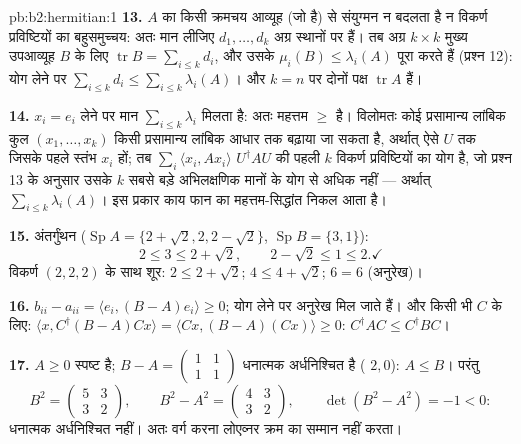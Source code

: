 \begin{solution}{pb:b2:hermitian:1}
\textbf{13.} $A$ का किसी क्रमचय आव्यूह (जो  है) से संयुग्मन न
 बदलता है न विकर्ण प्रविष्टियों का बहुसमुच्चय: अतः मान लीजिए $d_1, \dots, d_k$
अग्र स्थानों पर हैं। तब अग्र $k\times k$ मुख्य उपआव्यूह $B$ के लिए $\operatorname{tr} B = \sum_{i\leq k}d_i$, और उसके
 $\mu_i(B) \leq \lambda_i(A)$ पूरा करते हैं (प्रश्न 12): योग लेने पर $\sum_{i\leq k}d_i \leq \sum_{i\leq k}\lambda_i(A)$। और $k =
n$ पर
दोनों पक्ष $\operatorname{tr} A$ हैं।

\textbf{14.} $x_i = e_i$ लेने पर मान $\sum_{i\leq k}\lambda_i$ मिलता है: अतः महत्तम $\geq$ है। विलोमतः कोई
प्रसामान्य लांबिक कुल $(x_1, \dots, x_k)$ किसी प्रसामान्य लांबिक आधार तक बढ़ाया जा सकता
है, अर्थात् ऐसे  $U$ तक जिसके पहले स्तंभ $x_i$ हों; तब $\sum_i\langle x_i, Ax_i\rangle$ $U^\dagger AU$ की
पहली $k$ विकर्ण प्रविष्टियों का योग है, जो प्रश्न 13 के अनुसार उसके $k$
सबसे बड़े अभिलक्षणिक मानों के योग से अधिक नहीं --- अर्थात् $\sum_{i\leq k}\lambda_i(A)$। इस प्रकार
काय फान का महत्तम-सिद्धांत निकल आता है।

\textbf{15.} अंतर्गुंथन ($\operatorname{Sp}A = \{2+\sqrt2, 2,
2-\sqrt2\}$, $\operatorname{Sp}B = \{3, 1\}$):
\[
2 \leq 3 \leq 2 + \sqrt2,
\qquad
2 - \sqrt2 \leq 1 \leq 2 . \checkmark
\]
विकर्ण $(2,2,2)$ के साथ शूर: $2 \leq 2+\sqrt2$; $4 \leq 4 +
\sqrt2$; $6 = 6$ (अनुरेख)। \checkmark

\textbf{16.} $b_{ii} - a_{ii} = \langle e_i, (B-A)e_i\rangle
\geq 0$; योग लेने पर अनुरेख मिल जाते हैं। और किसी भी $C$ के लिए:
$\langle x,
C^\dagger(B - A)Cx\rangle = \langle Cx, (B-A)(Cx)\rangle \geq
0$: $C^\dagger AC \leq C^\dagger BC$।

\textbf{17.} $A \geq 0$ स्पष्ट है; $B - A = \begin{pmatrix} 1 & 1\\
1 & 1\end{pmatrix}$ धनात्मक अर्धनिश्चित है (
$2,
0$): $A \leq B$। परंतु
\[
B^2 = \begin{pmatrix} 5 & 3\\ 3 & 2\end{pmatrix},
\qquad
B^2 - A^2 = \begin{pmatrix} 4 & 3\\ 3 & 2\end{pmatrix},
\qquad \det(B^2 - A^2) = -1 < 0 :
\]
धनात्मक अर्धनिश्चित नहीं। अतः वर्ग करना लोएव्नर क्रम का सम्मान नहीं करता।


\end{solution}
